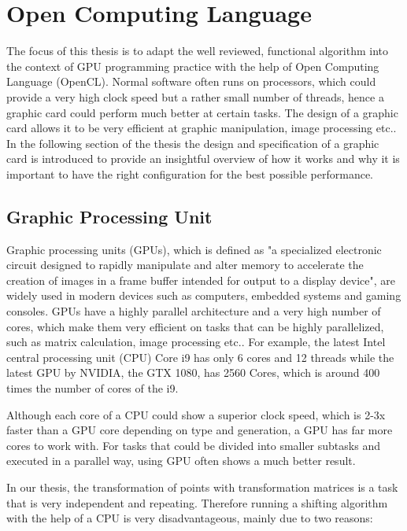 \chapter{Open Computing Language}
The focus of this thesis is to adapt the well reviewed, functional algorithm into the context of GPU programming practice with the help of Open Computing Language (OpenCL). Normal software often runs on processors, which could provide a very high clock speed but a rather small number of threads, hence a graphic card could perform much better at certain tasks. The design of a graphic card allows it to be very efficient at graphic manipulation, image processing etc.. In the following section of the thesis the design and specification of a graphic card is introduced to provide an insightful overview of how it works and why it is important to have the right configuration for the best possible performance.  
\section{Graphic Processing Unit}
Graphic processing units (GPUs), which is defined as "a specialized electronic circuit designed to rapidly manipulate and alter memory to accelerate the creation of images in a frame buffer intended for output to a display device"\cite{wikipedia}, are widely used in modern devices such as computers, embedded systems and gaming consoles. GPUs have a highly parallel architecture and a very high number of cores, which make them very efficient on tasks that can be highly parallelized, such as matrix calculation, image processing etc..  For example, the latest Intel central processing unit (CPU) Core i9 has only 6 cores and 12 threads while the latest GPU by NVIDIA, the GTX 1080, has 2560 Cores, which is around 400 times the number of cores of the i9.

Although each core of a CPU could show a superior clock speed, which is 2-3x faster than a GPU core depending on type and generation, a GPU has far more cores to work with. For tasks that could be divided into smaller subtasks and executed in a parallel way, using GPU often shows a much better result.

In our thesis, the transformation of points with transformation matrices is a task that is very independent and repeating. Therefore running a shifting algorithm with the help of a CPU is very disadvantageous, mainly due to two reasons:

